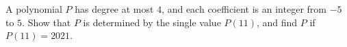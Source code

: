 A polynomial $P$ has degree at most $4$, and each coefficient is an integer from $-5$ to $5$. Show that $P$ is determined by the single value $P(11)$, and find $P$ if $P(11)=2021$.
